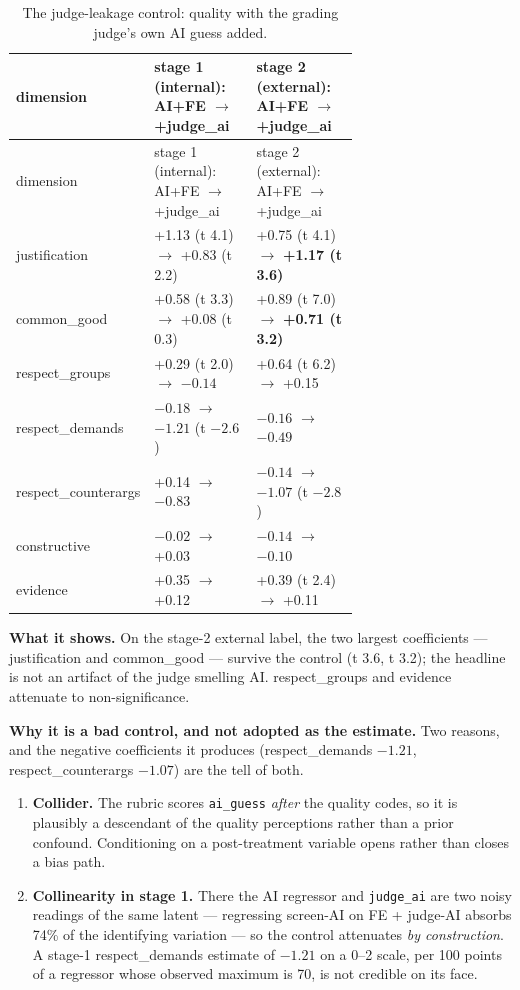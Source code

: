 \begingroup\small
\begin{longtable}[]{@{}lp{0.34\linewidth}p{0.34\linewidth}@{}}
\caption{The judge-leakage control: quality with the grading judge's own AI guess added.}\label{tab:judge-leakage}\\
\toprule\noalign{}
dimension & stage 1 (internal): AI+FE \(\rightarrow\) +judge\_ai & stage 2 (external): AI+FE \(\rightarrow\) +judge\_ai \\
\midrule\noalign{}
\endfirsthead
\toprule\noalign{}
dimension & stage 1 (internal): AI+FE \(\rightarrow\) +judge\_ai & stage 2 (external): AI+FE \(\rightarrow\) +judge\_ai \\
\midrule\noalign{}
\endhead
\bottomrule\noalign{}
\endlastfoot
justification & +1.13 (t 4.1) \(\rightarrow\) +0.83 (t 2.2) & +0.75 (t 4.1) \(\rightarrow\) \textbf{+1.17 (t 3.6)} \\
common\_good & +0.58 (t 3.3) \(\rightarrow\) +0.08 (t 0.3) & +0.89 (t 7.0) \(\rightarrow\) \textbf{+0.71 (t 3.2)} \\
respect\_groups & +0.29 (t 2.0) \(\rightarrow\) \(-0.14\) & +0.64 (t 6.2) \(\rightarrow\) +0.15 \\
respect\_demands & \(-0.18\) \(\rightarrow\) \(-1.21\) (t \(-2.6\)) & \(-0.16\) \(\rightarrow\) \(-0.49\) \\
respect\_counterargs & +0.14 \(\rightarrow\) \(-0.83\) & \(-0.14\) \(\rightarrow\) \(-1.07\) (t \(-2.8\)) \\
constructive & \(-0.02\) \(\rightarrow\) +0.03 & \(-0.14\) \(\rightarrow\) \(-0.10\) \\
evidence & +0.35 \(\rightarrow\) +0.12 & +0.39 (t 2.4) \(\rightarrow\) +0.11 \\
\end{longtable}
\endgroup

\textbf{What it shows.} On the stage-2 external label, the two largest coefficients ---
justification and common\_good --- survive the control (t 3.6, t 3.2); the
headline is not an artifact of the judge smelling AI. respect\_groups and
evidence attenuate to non-significance.

\textbf{Why it is a bad control, and not adopted as the estimate.} Two reasons, and
the negative coefficients it produces (respect\_demands \(-1.21\), respect\_counterargs
\(-1.07\)) are the tell of both.

\begin{enumerate}
\def\labelenumi{\arabic{enumi}.}
\tightlist
\item
  \textbf{Collider.} The rubric scores \texttt{ai\_guess} \emph{after} the quality codes, so it
  is plausibly a descendant of the quality perceptions rather than a prior
  confound. Conditioning on a post-treatment variable opens rather than closes
  a bias path.
\item
  \textbf{Collinearity in stage 1.} There the AI regressor and \texttt{judge\_ai} are two
  noisy readings of the same latent --- regressing screen-AI on FE + judge-AI
  absorbs 74\% of the identifying variation --- so the control attenuates \emph{by
  construction}. A stage-1 respect\_demands estimate of \(-1.21\) on a 0--2 scale,
  per 100 points of a regressor whose observed maximum is 70, is not credible
  on its face.
\end{enumerate}

